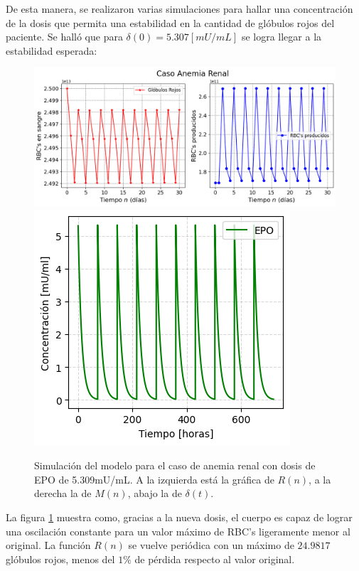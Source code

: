 De esta manera, se realizaron varias simulaciones para hallar una concentración de la dosis que permita una estabilidad en la cantidad de glóbulos rojos del paciente. Se halló que para $\delta(0) = 5.307 [mU/mL]$ se logra llegar a la estabilidad esperada: 
\begin{figure}[H]
    \centering
    \captionsetup{justification=centering}
    \includegraphics[scale=0.526]{figures/AR21.png}
    \includegraphics[scale=0.8]{figures/AR22.png}
    \caption{Simulación del modelo para el caso de anemia renal con dosis de EPO de 5.309mU/mL. A la izquierda está la gráfica de $R(n)$, a la derecha la de $M(n)$, abajo la de $\delta(t)$.}
    \label{sec:variaciones:fig:Anemia2}
\end{figure}

La figura \ref{sec:variaciones:fig:Anemia2} muestra como, gracias a la nueva dosis, el cuerpo es capaz de lograr una oscilación constante para un valor máximo de RBC's ligeramente menor al original. La función $R(n)$ se vuelve periódica con un máximo de $24.9817$ glóbulos rojos, menos del $1\%$ de pérdida respecto al valor original.